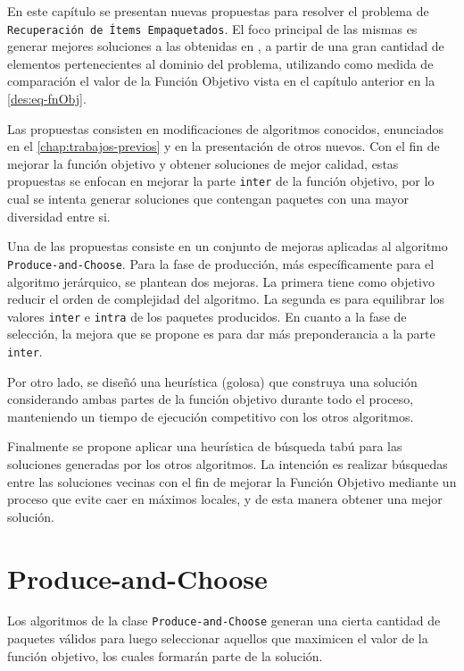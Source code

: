 En este capítulo se presentan nuevas propuestas para resolver el problema de \texttt{\\Recuperación de Ítems Empaquetados}. El foco principal de las mismas es generar mejores soluciones a las obtenidas en \cite{journals/tkde/Amer-YahiaBCFMZ14}, a partir de una gran cantidad de elementos pertenecientes al dominio del problema, utilizando como medida de comparación el valor de la Función Objetivo vista en el capítulo anterior en la \autoref{des:eq-fnObj}.

Las propuestas consisten en modificaciones de algoritmos conocidos, enunciados en el \autoref{chap:trabajos-previos} y en la presentación de otros nuevos. Con el fin de mejorar la función objetivo y obtener soluciones de mejor calidad, estas propuestas se enfocan en mejorar la parte \texttt{inter} de la función objetivo, por lo cual se intenta generar soluciones que contengan paquetes con una mayor diversidad entre si.

Una de las propuestas consiste en un conjunto de mejoras aplicadas al algoritmo \allowbreak \texttt{Produce\allowbreak-and\allowbreak-Choose}. Para la fase de producción, más específicamente para el algoritmo jerárquico, se plantean dos mejoras. La primera tiene como objetivo reducir el orden de complejidad del algoritmo. La segunda es para equilibrar los valores \texttt{inter} e \texttt{intra} de los paquetes producidos. En cuanto a la fase de selección, la mejora que se propone es para dar más preponderancia a la parte \texttt{inter}.

Por otro lado, se diseñó una heurística (golosa) que construya una solución considerando ambas partes de la función objetivo durante todo el proceso, manteniendo un tiempo de ejecución competitivo con los otros algoritmos.

Finalmente se propone aplicar una heurística de búsqueda tabú para las soluciones generadas por los otros algoritmos. La intención es realizar búsquedas entre las soluciones vecinas con el fin de mejorar la Función Objetivo mediante un proceso que evite caer en máximos locales, y de esta manera obtener una mejor solución.

\section{Produce-and-Choose}
Los algoritmos de la clase \texttt{Produce\allowbreak-and\allowbreak-Choose} generan una cierta cantidad de paquetes válidos para luego seleccionar aquellos que maximicen el valor de la función objetivo, los cuales formarán parte de la solución.

